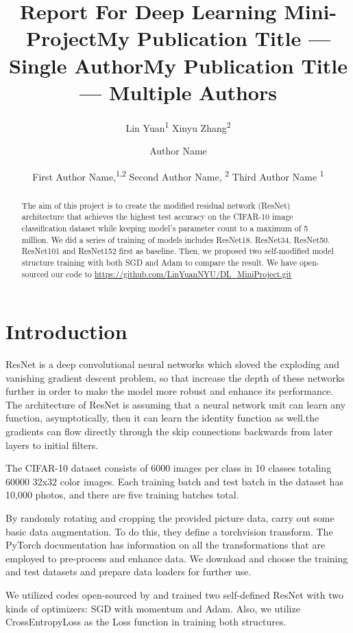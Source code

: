 \documentclass[letterpaper]{article} %
\title{Report For Deep Learning Mini-Project}
\author{
    Lin Yuan\textsuperscript{\rm 1}
    Xinyu Zhang\textsuperscript{\rm 2}
}
\title{My Publication Title --- Single Author}
\author {
    Author Name
}
\title{My Publication Title --- Multiple Authors}
\author {
    First Author Name,\textsuperscript{\rm 1,\rm 2}
    Second Author Name, \textsuperscript{\rm 2}
    Third Author Name \textsuperscript{\rm 1}
}
\begin{document}
\maketitle

\begin{abstract}
The aim of this project is to create the modified residual network (ResNet) architecture that achieves the highest test accuracy on the CIFAR-10 image classification dataset while keeping model's parameter count to a maximum of 5 million. We did a series of training of models includes ResNet18. ResNet34, ResNet50. ResNet101 and ResNet152 first as baseline. Then, we proposed two self-modified model structure training with both SGD and Adam to compare the result. We have open-sourced our code to \url{https://github.com/LinYuanNYU/DL_MiniProject.git}\end{abstract}

\section{Introduction}

ResNet \cite{DBLP:journals/corr/HeZRS15} is a deep convolutional neural networks which sloved the exploding and vanishing gradient descent problem, so that increase the depth of these networks further in order to make the model more robust and enhance its performance. The architecture of ResNet is assuming that a neural network unit can learn any function, asymptotically, then it can learn the identity function as well.the gradients can flow directly through the skip connections backwards from later layers to initial filters.

The CIFAR-10 dataset consists of 6000 images per class in 10 classes totaling 60000 32x32 color images. Each training batch and test batch in the dataset has 10,000 photos, and there are five training batches total.

By randomly rotating and cropping the provided picture data, \cite{Wang_2017_CVPR} carry out some basic data augmentation. To do this, they define a torchvision transform. The PyTorch documentation has information on all the transformations that are employed to pre-process and enhance data. We download and choose the training and test datasets and prepare data loaders for further use.

We utilized codes open-sourced by \cite{kuangliupytorch-cifar} and trained two self-defined ResNet with two kinds of optimizers: SGD with momentum and Adam. Also, we utilize CrossEntropyLoss as the Loss function in training both structures.
\end{document}
